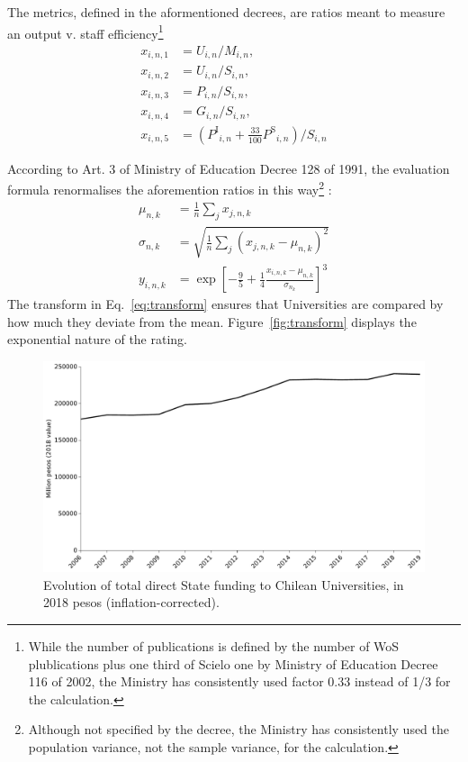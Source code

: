 \documentclass[twocolumn]{article}
\def\npup{\ensuremath{U}}
\def\nmaj{\ensuremath{M}}
\def\nprof{\ensuremath{S}}
\def\ngrad{\ensuremath{P}}
\def\ngrant{\ensuremath{G}}
\def\nisi{\ensuremath{P^\text{I}}}
\def\nscielo{\ensuremath{P^\text{S}}}
\begin{document}
The metrics, defined in the aformentioned decrees, are ratios meant to measure an output v. staff efficiency\footnote{While the number of publications is defined by the number of WoS plublications plus one third of Scielo one by Ministry of Education Decree 116 of 2002, the Ministry has consistently used factor 0.33 instead of 1/3 for the calculation.}
\begin{subequations}
\begin{align}
    x_{i,n,1} &= \npup_{i,n} / \nmaj_{i,n},  \label{eq:x1}                          \\
    x_{i,n,2} &= \npup_{i,n} / \nprof_{i,n},                           \\ 
    x_{i,n,3} &= \ngrad_{i,n} / \nprof_{i,n},                          \\
    x_{i,n,4} &= \ngrant_{i,n} / \nprof_{i,n},                         \\
    x_{i,n,5} &= (\nisi_{i,n} + \frac{33}{100} \nscielo_{i,n}) / \nprof_{i,n}
\end{align}
\end{subequations}

According to Art. 3 of Ministry of Education Decree 128 of 1991,  the
evaluation formula renormalises the aforemention ratios in this
way\footnote{Although not specified by the decree, the Ministry has
consistently used the population variance, not the sample variance, for the calculation.} :
\begin{subequations}
\begin{align}
    \mu_{n,k}    &= \frac1n\sum_j x_{j,n,k}\\
    \sigma_{n,k} &= \sqrt{\frac 1n \sum_j \left(x_{j,n,k} - \mu_{n,k}\right)^2 }\\
    y_{i,n,k}    &= \exp \left[ -\frac 95 + \frac14 \frac{x_{i,n,k} - \mu_{n,k} }{\sigma_{n_k}} \right]^3 \label{eq:transform}
\end{align}
\end{subequations}
The transform in Eq.~\ref{eq:transform} ensures that Universities are compared by how much they deviate from
the mean.  Figure~\ref{fig:transform} displays the exponential nature of the rating.

\begin{figure}
\centering
\includegraphics[width=\linewidth]{total-afd-timeseries.pdf}
\caption{Evolution of total direct State funding to Chilean Universities, in 2018
pesos (inflation-corrected).}
\label{fig:total-afd}
\end{figure}
\end{document}
